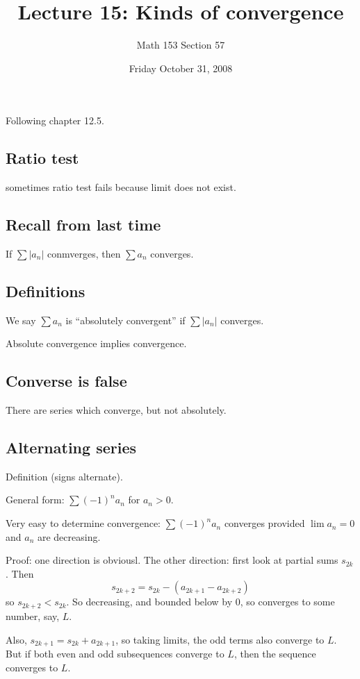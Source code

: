 \documentclass[12pt]{article}
\title{Lecture 15: Kinds of convergence}
\author{Math 153 Section 57}
\date{Friday October 31, 2008}
\begin{document}
\maketitle

Following chapter 12.5.

\subsection{Ratio test}

sometimes ratio test fails because limit does not exist.

\subsection{Recall from last time}

If $\sum |a_n|$ conmverges, then $\sum a_n$ converges.

\subsection{Definitions}

We say $\sum a_n$ is ``absolutely convergent'' if $\sum |a_n|$
converges.

Absolute convergence implies convergence.

\subsection{Converse is false}

There are series which converge, but not absolutely.

\subsection{Alternating series}

Definition (signs alternate).

General form: $\sum (-1)^n a_n$ for $a_n > 0$.

Very easy to determine convergence: $\sum (-1)^n a_n$ converges
provided $\lim a_n = 0$ and $a_n$ are decreasing.

Proof:  one direction is obviousl.  The other direction: first look at partial sums $s_{2k}$.  Then
$$
s_{2k+2} = s_{2k} - (a_{2k+1} - a_{2k+2})
$$
so $s_{2k+2} < s_{2k}$.  So decreasing, and bounded below by $0$, so
converges to some number, say, $L$.

Also, $s_{2k+1} = s_{2k} + a_{2k+1}$, so taking limits, the odd terms also converge to $L$.  But if both even and odd subsequences converge to $L$, then the sequence converges to $L$.
\end{document}
